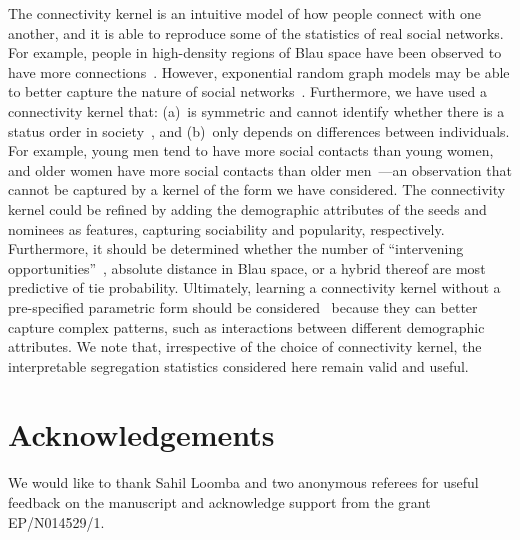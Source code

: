\documentclass{scrartcl}
\begin{document}
The connectivity kernel is an intuitive model of how people connect with one another, and it is able to reproduce some of the statistics of real social networks. For example, people in high-density regions of Blau space have been observed to have more connections~\cite{Currarini2009}. However, exponential random graph models may be able to better capture the nature of social networks~\cite{Wimmer2010}. Furthermore, we have used a connectivity kernel that: (a)~is symmetric and cannot identify whether there is a status order in society~\cite{Chan2004,Ball2013}, and (b)~only depends on differences between individuals. For example, young men tend to have more social contacts than young women, and older women have more social contacts than older men~\cite{Bhattacharya2016}---an observation that cannot be captured by a kernel of the form we have considered. The connectivity kernel could be refined by adding the demographic attributes of the seeds and nominees as features, capturing sociability and popularity, respectively. Furthermore, it should be determined whether the number of ``intervening opportunities''~\cite{Stouffer1940}, absolute distance in Blau space, or a hybrid thereof are most predictive of tie probability. Ultimately, learning a connectivity kernel without a pre-specified parametric form should be considered~\cite{Frolich2006} because they can better capture complex patterns, such as interactions between different demographic attributes. We note that, irrespective of the choice of connectivity kernel, the interpretable segregation statistics considered here remain valid and useful.

\section*{Acknowledgements}

We would like to thank Sahil Loomba and two anonymous referees for useful feedback on the manuscript and acknowledge support from the grant EP/N014529/1.

\printbibliography
\end{document}

